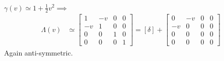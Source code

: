 \documentclass{article}
\newcommand{\onehalf}{\frac{1}{2}}
\begin{document}
$\gamma(v) \simeq 1 + \onehalf v^2 \implies $
\begin{equation}
    \begin{split}
        \Lambda(v) & \simeq \begin{bmatrix}
             1 & - v & 0 & 0\\
                -v & 1 & 0 & 0 \\
                0 & 0 & 1 & 0 \\
                0 & 0 & 0 & 1
                        \end{bmatrix} = [\delta] + \begin{bmatrix}
                            0 & - v & 0 & 0\\
                               -v & 0 & 0 & 0 \\
                               0 & 0 & 0 & 0 \\
                               0 & 0 & 0 & 0
                                       \end{bmatrix}
    \end{split}
\end{equation}
Again anti-symmetric.
\end{document}
